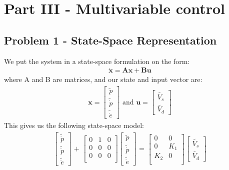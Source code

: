 \section{Part III - Multivariable control}\label{sec:part3}
\subsection{Problem 1 - State-Space Representation}
We put the system in a state-space formulation on the form:
\begin{gather*}
    \mathbf{\dot{x}} = \mathbf{Ax} + \mathbf{Bu}
\end{gather*}
where A and B are matrices, and our state and input vector are: 
\begin{gather*}
    \mathbf{x} = 
    \begin{bmatrix}
        \tilde{p}\\\tilde{\dot{p}}\\\tilde{\dot{e}}
        \end{bmatrix}
     \text{  and  } \mathbf{u} = 
    \begin{bmatrix} \tilde{V_s}\\\tilde{V_d} \end{bmatrix}
\end{gather*}
This gives us the following state-space model:
\begin{gather*}
     \begin{bmatrix}
        \tilde{\dot{p}}\\\tilde{\ddot{p}}\\\tilde{\ddot{e}}
    \end{bmatrix}
    \text{ + } \begin{bmatrix}
        0 & 1 & 0 \\
        0 & 0 & 0 \\
        0 & 0 & 0 \\ \end{bmatrix}
    \begin{bmatrix}
        \tilde{p}\\\tilde{\dot{p}}\\\tilde{\dot{e}}
    \end{bmatrix}
    \text{ = } \begin{bmatrix}
        0 & 0 \\
        0 & K_1 \\
        K_2 & 0 \\
    \end{bmatrix}
    \begin{bmatrix} \tilde{V_s}\\\tilde{V_d} \end{bmatrix}
\end{gather*}

